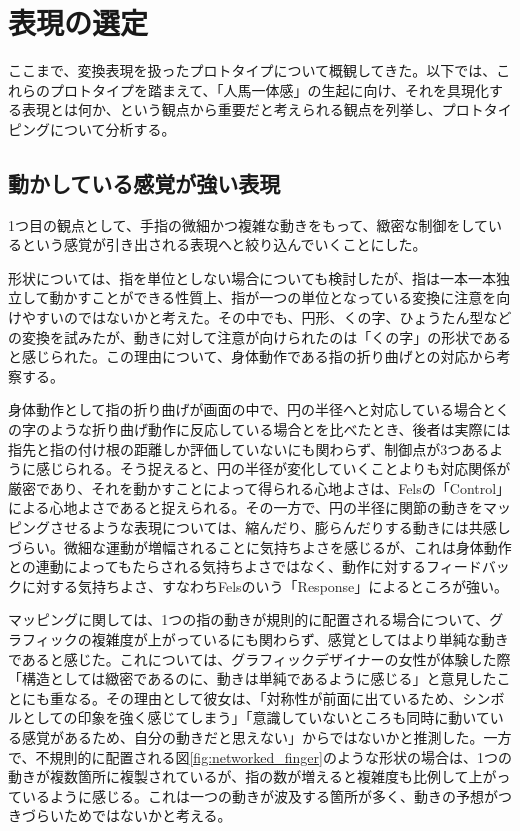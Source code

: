 \section{表現の選定}
ここまで、変換表現を扱ったプロトタイプについて概観してきた。以下では、これらのプロトタイプを踏まえて、「人馬一体感」の生起に向け、それを具現化する表現とは何か、という観点から重要だと考えられる観点を列挙し、プロトタイピングについて分析する。

\subsection{動かしている感覚が強い表現}
1つ目の観点として、手指の微細かつ複雑な動きをもって、緻密な制御をしているという感覚が引き出される表現へと絞り込んでいくことにした。

形状については、指を単位としない場合についても検討したが、指は一本一本独立して動かすことができる性質上、指が一つの単位となっている変換に注意を向けやすいのではないかと考えた。その中でも、円形、くの字、ひょうたん型などの変換を試みたが、動きに対して注意が向けられたのは「くの字」の形状であると感じられた。この理由について、身体動作である指の折り曲げとの対応から考察する。

身体動作として指の折り曲げが画面の中で、円の半径へと対応している場合とくの字のような折り曲げ動作に反応している場合とを比べたとき、後者は実際には指先と指の付け根の距離しか評価していないにも関わらず、制御点が3つあるように感じられる。そう捉えると、円の半径が変化していくことよりも対応関係が厳密であり、それを動かすことによって得られる心地よさは、Felsの「Control」による心地よさであると捉えられる。その一方で、円の半径に関節の動きをマッピングさせるような表現については、縮んだり、膨らんだりする動きには共感しづらい。微細な運動が増幅されることに気持ちよさを感じるが、これは身体動作との連動によってもたらされる気持ちよさではなく、動作に対するフィードバックに対する気持ちよさ、すなわちFelsのいう「Response」によるところが強い。

マッピングに関しては、1つの指の動きが規則的に配置される場合について、グラフィックの複雑度が上がっているにも関わらず、感覚としてはより単純な動きであると感じた。これについては、グラフィックデザイナーの女性が体験した際「構造としては緻密であるのに、動きは単純であるように感じる」と意見したことにも重なる。その理由として彼女は、「対称性が前面に出ているため、シンボルとしての印象を強く感じてしまう」「意識していないところも同時に動いている感覚があるため、自分の動きだと思えない」からではないかと推測した。一方で、不規則的に配置される図\ref{fig:networked_finger}のような形状の場合は、1つの動きが複数箇所に複製されているが、指の数が増えると複雑度も比例して上がっているように感じる。これは一つの動きが波及する箇所が多く、動きの予想がつきづらいためではないかと考える。

